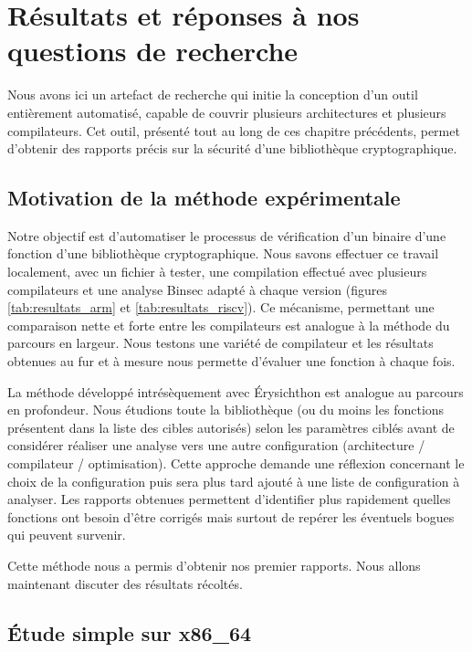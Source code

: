 \chapter{Résultats et réponses à nos questions de recherche}

Nous avons ici un artefact de recherche qui initie la conception d'un outil entièrement automatisé, capable de couvrir plusieurs architectures et plusieurs compilateurs. Cet outil, présenté tout au long de ces chapitre précédents, permet d'obtenir des rapports précis sur la sécurité d'une bibliothèque cryptographique. 

\section{Motivation de la méthode expérimentale}

Notre objectif est d'automatiser le processus de vérification d'un binaire d'une fonction d'une bibliothèque cryptographique. Nous savons effectuer ce travail localement, avec un fichier à tester, une compilation effectué avec plusieurs compilateurs et une analyse Binsec adapté à chaque version (\eg figures \ref{tab:resultats_arm} et \ref{tab:resultats_riscv}). Ce mécanisme, permettant une comparaison nette et forte entre les compilateurs est analogue à la méthode du parcours en largeur. Nous testons une variété de compilateur et les résultats obtenues au fur et à mesure nous permette d'évaluer une fonction à chaque fois.\medbreak

La méthode développé intrésèquement avec Érysichthon est analogue au parcours en profondeur. Nous étudions toute la bibliothèque (ou du moins les fonctions présentent dans la liste des cibles autorisés) selon les paramètres ciblés avant de considérer réaliser une analyse vers une autre configuration (architecture / compilateur / optimisation). Cette approche demande une réflexion concernant le choix de la configuration puis sera plus tard ajouté à une liste de configuration à analyser. Les rapports obtenues permettent d'identifier plus rapidement quelles fonctions ont besoin d'être corrigés mais surtout de repérer les éventuels bogues qui peuvent survenir.\smallbreak

Cette méthode nous a permis d'obtenir nos premier rapports. Nous allons maintenant discuter des résultats récoltés.

\section{Étude simple sur x86\_64}

